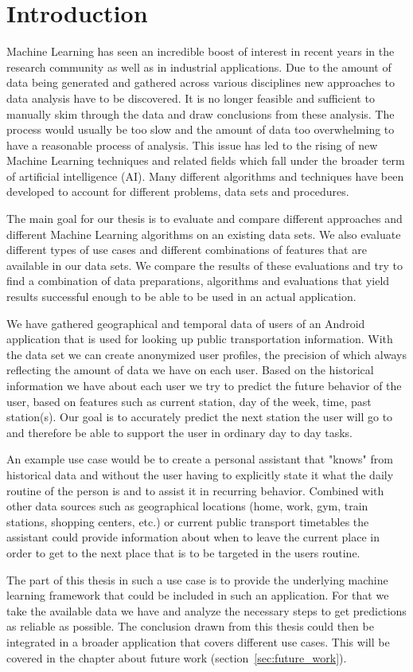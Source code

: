\section{Introduction}

Machine Learning has seen an incredible boost of interest in recent years in the research community as well as in industrial applications. Due to the amount of data being generated and gathered across various disciplines new approaches to data analysis have to be discovered. It is no longer feasible and sufficient to manually skim through the data and draw conclusions from these analysis. The process would usually be too slow and the amount of data too overwhelming to have a reasonable process of analysis. This issue has led to the rising of new Machine Learning techniques and related fields which fall under the broader term of artificial intelligence (AI). Many different algorithms and techniques have been developed to account for different problems, data sets and procedures.

The main goal for our thesis is to evaluate and compare different approaches and different Machine Learning algorithms on an existing data sets. We also evaluate different types of use cases and different combinations of features that are available in our data sets. We compare the results of these evaluations and try to find a combination of data preparations, algorithms and evaluations that yield results successful enough to be able to be used in an actual application. 

We have gathered geographical and temporal data of users of an Android application that is used for looking up public transportation information. With the data set we can create anonymized user profiles, the precision of which always reflecting the amount of data we have on each user. Based on the historical information we have about each user we try to predict the future behavior of the user, based on features such as current station, day of the week, time, past station(s). Our goal is to accurately predict the next station the user will go to and therefore be able to support the user in ordinary day to day tasks. 

An example use case would be to create a personal assistant that "knows" from historical data and without the user having to explicitly state it what the daily routine of the person is and to assist it in recurring behavior. Combined with other data sources such as geographical locations (home, work, gym, train stations, shopping centers, etc.) or current public transport timetables the assistant could provide information about when to leave the current place in order to get to the next place that is to be targeted in the users routine. 

The part of this thesis in such a use case is to provide the underlying machine learning framework that could be included in such an application. For that we take the available data we have and analyze the necessary steps to get predictions as reliable as possible. The conclusion drawn from this thesis could then be integrated in a broader application that covers different use cases. This will be covered in the chapter about future work (section~\ref{sec:future_work}).